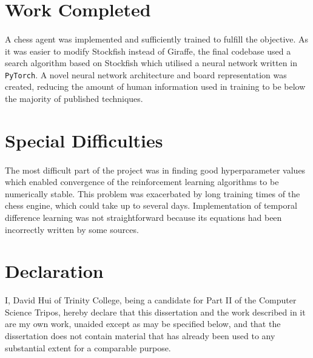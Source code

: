 \documentclass[12pt,a4paper]{book}
\begin{document}
\section*{Work Completed}

\paragraph{} A chess agent was implemented and sufficiently trained to fulfill the objective. As it was easier to modify Stockfish instead of Giraffe, the final codebase used a search algorithm based on Stockfish which utilised a neural network written in \texttt{PyTorch}. A novel neural network architecture and board representation was created, reducing the amount of human information used in training to be below the majority of published techniques.

\section*{Special Difficulties}

\paragraph{} The most difficult part of the project was in finding good hyperparameter values which enabled convergence of the reinforcement learning algorithms to be numerically stable. This problem was exacerbated by long training times of the chess engine, which could take up to several days. Implementation of temporal difference learning was not straightforward because its equations had been incorrectly written by some sources.

\newpage
\section*{Declaration}

I, David Hui of Trinity College, being a candidate for Part II of the Computer Science Tripos, hereby declare that this dissertation and the work described in it are my own work, unaided except as may be specified below, and that the dissertation does not contain material that has already been used to any substantial extent for a comparable purpose.

\bigskip
{}

\medskip
{}

\cleardoublepage

\tableofcontents
\end{document}
